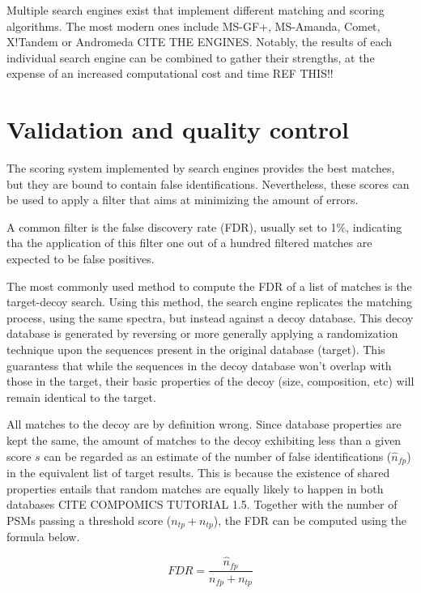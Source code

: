 \documentclass[11pt, a4paper]{report}
\begin{document}
Multiple search engines exist that implement different matching and scoring algorithms. The most modern ones include MS-GF+, MS-Amanda, Comet, X!Tandem or Andromeda CITE THE ENGINES. Notably, the results of each individual search engine can be combined to gather their strengths, at the expense of an increased computational cost and time REF THIS!!



\section{Validation and quality control}
\label{sec:validation}

The scoring system implemented by search engines provides the best matches, but they are bound to contain false identifications. Nevertheless, these scores can be used to apply a filter that aims at minimizing the amount of errors.

A common filter is the false discovery rate (FDR), usually set to 1\%, indicating tha the application of this filter one out of a hundred filtered matches are expected to be false positives.

The most commonly used method to compute the FDR of a list of matches is the target-decoy search. Using this method, the search engine replicates the matching process, using the same spectra, but instead against a decoy database. This decoy database is generated by reversing or more generally applying a randomization technique upon the sequences present in the original database (target). This guarantess that while the sequences in the decoy database won't overlap with those in the target, their basic properties of the decoy (size, composition, etc) will remain identical to the target.

All matches to the decoy are by definition wrong. Since database properties 
are kept the same, the amount of matches to the decoy exhibiting less than a given score $s$ can be regarded as an estimate of the number of false identifications ($\hat{n}_{fp}$) in the equivalent list of target results. This is because the existence of shared properties entails that random matches are equally likely to happen in both databases CITE COMPOMICS TUTORIAL 1.5. Together with the number of PSMs passing a threshold score ($n_{tp} + n_{tp}$), the FDR can be computed using the formula below.

\begin{equation}\label{eq:fdr}
FDR = \frac{\hat{n}_{fp}}{n_{fp} + n_{tp}}
\end{equation}
\end{document}

